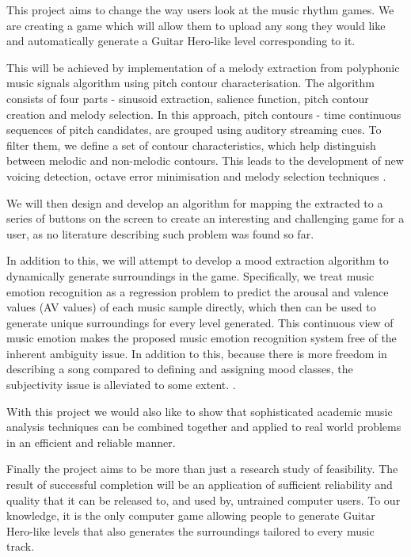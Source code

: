 This project aims to change the way users look at the music rhythm games. We are creating a game which will allow them to upload any song they would like and automatically generate a Guitar Hero-like level corresponding to it. 

This will be achieved by implementation of a melody extraction from polyphonic music signals algorithm using pitch contour characterisation. The algorithm consists of four parts - sinusoid extraction, salience function, pitch contour creation and melody selection. In this approach, pitch contours - time continuous sequences of pitch candidates, are grouped using auditory streaming cues. To filter them, we define a set of contour characteristics, which help distinguish between melodic and non-melodic contours. This leads to the development of new voicing detection, octave error minimisation and melody selection techniques \cite{salamon}.

We will then design and develop an algorithm for mapping the extracted to a series of buttons on the screen to create an interesting and challenging game for a user, as no literature describing such problem was found so far.

In addition to this, we will attempt to develop a mood extraction algorithm to dynamically generate surroundings in the game. Specifically, we treat music emotion recognition as a regression problem to predict the arousal and valence values (AV values) of each music sample directly, which then can be used to generate unique surroundings for every level generated. This continuous view of music emotion makes the proposed music emotion recognition system free of the inherent ambiguity issue. In addition to this, because there is more freedom in describing a song compared to defining and assigning mood classes, the subjectivity issue is alleviated to some extent. \cite{mood}.

With this project we would also like to show that sophisticated academic music analysis techniques can be combined together and applied to real world problems in an efficient and reliable manner. 

Finally the project aims to be more than just a research study of feasibility. The result of successful completion will be an application of sufficient reliability and quality that it can be released to, and used by, untrained computer users. To our knowledge, it is the only computer game allowing people to generate Guitar Hero-like levels that also generates the surroundings tailored to every music track.

